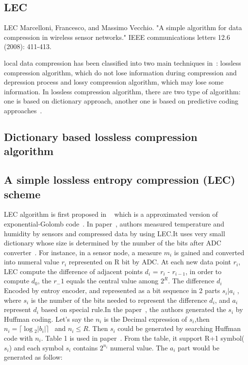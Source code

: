 \documentclass{report}
\begin{document}
\subsection{LEC}
LEC
Marcelloni, Francesco, and Massimo Vecchio. "A simple algorithm for data compression in wireless sensor networks." IEEE communications letters 12.6 (2008): 411-413.

local data compression has been classified into two main techniques in~\cite{srisooksai2012practical}: lossless compression algorithm, which do not lose information during compression and depression process and lossy compression algorithm, which may lose some information.
In lossless compression algorithm, there are two type of algorithm: one is based on dictionary approach, another one is based on predictive coding approaches~\cite{srisooksai2012practical}.
\subsection{Dictionary based lossless compression algorithm}
\subsection{A simple lossless entropy compression (LEC) scheme}
LEC algorithm is first proposed in ~\cite{marcelloni2008simple} which is a approximated version of exponential-Golomb code~\cite{teuhola1978compression}.
In paper~\cite{marcelloni2008simple}, authors measured temperature and humidity by sensors and compressed data by using LEC.It uses very small dictionary whose size is determined by the number of the bits after ADC converter~\cite{marcelloni2008simple}. 
For instance, in a sensor node, a measure $m_i$ is gained and converted into numeral value $r_i$ represented on R bit by ADC. At each new data point $r_i$, LEC compute the difference of adjacent points $d_i$ = $r_i$ - $r_{i-1}$, in order to compute $d_0$, the $r_-1$ equals the central value among $2^R$. The difference $d_i$ Encoded by entroy encoder, and represented as a bit sequence in 2 parts $s_i | a_i$ , where $s_i$ is the number of the bits needed to represent the difference $d_i$, and $a_i$ represent $d_i$ based on special rule.In the paper~\cite{marcelloni2008simple}, the authors generated the $s_i$ by Huffman coding. Let's say the $n_i$ is the Decimal expression of $s_i$,then $n_i = \lceil\log{_2}{\left|{b_i}\right|}\rceil$~\cite{marcelloni2008simple} and $n_i \leq R$. Then $s_i$ could be generated by searching Huffman code with $n_i$. Table 1 is used in paper~\cite{marcelloni2008simple}. From the table, it support R+1 symbol($s_i$) and each symbol $s_i$ contains $2^{n_i}$ numeral value. The $a_i$ part would be generated as follow:
\end{document}

